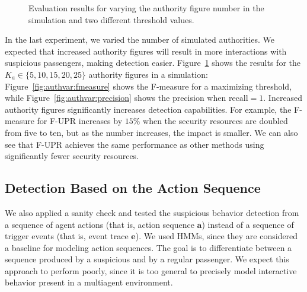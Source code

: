 {%


\begin{figure}[!ht]
\centering
{}

\caption{Evaluation results for varying the authority figure number in the simulation and two different threshold values.}
\label{fig:authvar}
\end{figure}

In the last experiment, we varied the number of simulated authorities. We expected that increased authority figures will result in more interactions with suspicious passengers, making detection easier. Figure~\ref{fig:authvar} shows the results for the $K_a \in \{5,10,15,20,25\}$ authority figures in a simulation:  Figure~\ref{fig:authvar:fmeasure} shows the F-measure for a maximizing threshold, while Figure~\ref{fig:authvar:precision} shows the precision when $\text{recall}=1$. Increased authority figures significantly increases detection capabilities. For example, the F-measure for F-UPR increases by $15\%$ when the security resources are doubled from five to ten, but as the number increases, the impact is smaller. We can also see that F-UPR achieves the same performance as other methods using significantly fewer security resources. 
%



\subsection{Detection Based on the Action Sequence}
\label{sec:HMMexp}
\noindent
We also applied a sanity check and tested the suspicious behavior detection from a sequence of agent actions (that is, action sequence $\mathbf{a}$) instead of a sequence of trigger events (that is, event trace $\mathbf{e}$). We used HMMs, since they are considered a baseline for modeling action sequences. The goal is to differentiate between a sequence produced by a suspicious and by a regular passenger. We expect this approach to perform poorly, since it is too general to precisely model interactive behavior present in a multiagent environment.

}
